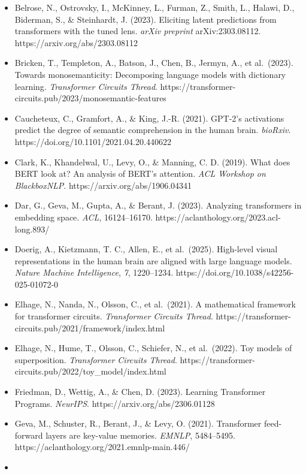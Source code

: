 \documentclass[
  11pt,
  a4paper,
]{article}
\begin{document}
\begin{itemize}
\item
  Belrose, N., Ostrovsky, I., McKinney, L., Furman, Z., Smith, L.,
  Halawi, D., Biderman, S., \& Steinhardt, J. (2023). Eliciting latent
  predictions from transformers with the tuned lens. \emph{arXiv
  preprint} arXiv:2303.08112. https://arxiv.org/abs/2303.08112
\item
  Bricken, T., Templeton, A., Batson, J., Chen, B., Jermyn, A., et
  al.~(2023). Towards monosemanticity: Decomposing language models with
  dictionary learning. \emph{Transformer Circuits Thread}.
  https://transformer-circuits.pub/2023/monosemantic-features
\item
  Caucheteux, C., Gramfort, A., \& King, J.-R. (2021). GPT-2's
  activations predict the degree of semantic comprehension in the human
  brain. \emph{bioRxiv}. https://doi.org/10.1101/2021.04.20.440622
\item
  Clark, K., Khandelwal, U., Levy, O., \& Manning, C. D. (2019). What
  does BERT look at? An analysis of BERT's attention. \emph{ACL Workshop
  on BlackboxNLP}. https://arxiv.org/abs/1906.04341
\item
  Dar, G., Geva, M., Gupta, A., \& Berant, J. (2023). Analyzing
  transformers in embedding space. \emph{ACL}, 16124--16170.
  https://aclanthology.org/2023.acl-long.893/
\item
  Doerig, A., Kietzmann, T. C., Allen, E., et al.~(2025). High-level
  visual representations in the human brain are aligned with large
  language models. \emph{Nature Machine Intelligence}, \emph{7},
  1220--1234. https://doi.org/10.1038/s42256-025-01072-0
\item
  Elhage, N., Nanda, N., Olsson, C., et al.~(2021). A mathematical
  framework for transformer circuits. \emph{Transformer Circuits
  Thread}. https://transformer-circuits.pub/2021/framework/index.html
\item
  Elhage, N., Hume, T., Olsson, C., Schiefer, N., et al.~(2022). Toy
  models of superposition. \emph{Transformer Circuits Thread}.
  https://transformer-circuits.pub/2022/toy\_model/index.html
\item
  Friedman, D., Wettig, A., \& Chen, D. (2023). Learning Transformer
  Programs. \emph{NeurIPS}. https://arxiv.org/abs/2306.01128
\item
  Geva, M., Schuster, R., Berant, J., \& Levy, O. (2021). Transformer
  feed-forward layers are key-value memories. \emph{EMNLP}, 5484--5495.
  https://aclanthology.org/2021.emnlp-main.446/
\item

\end{itemize}
\end{document}
